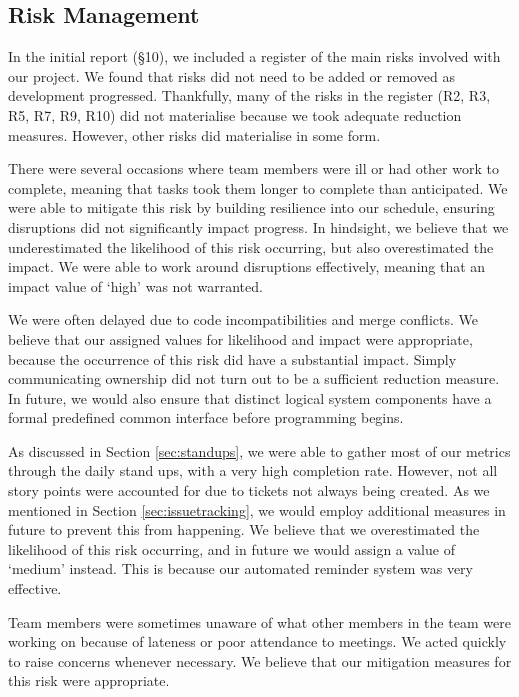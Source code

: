 \subsection{Risk Management}
In the initial report (§10), we included a register of the main risks involved with our project.  We found that risks did not need to be added or removed as development progressed. Thankfully, many of the risks in the register (R2, R3, R5, R7, R9, R10) did not materialise because we took adequate reduction measures. However, other risks did materialise in some form. 
\newpage
\begin{description}[topsep=3pt, itemsep=2pt]
	\item[R1: Unavailability of Team Members] There were several occasions where team members were ill or had other work to complete, meaning that tasks took them longer to complete than anticipated. We were able to mitigate this risk by building resilience into our schedule, ensuring disruptions did not significantly impact progress. In hindsight, we believe that we underestimated the likelihood of this risk occurring, but also overestimated the impact. We were able to work around disruptions effectively, meaning that an impact value of `high’ was not warranted.
	\item[R4: Incompatibilities and Merge Conflcits] We were often delayed due to code incompatibilities and merge conflicts. We believe that our assigned values for likelihood and impact were appropriate, because the occurrence of this risk did have a substantial impact. Simply communicating ownership did not turn out to be a sufficient reduction measure. In future, we would also ensure that distinct logical system components have a formal predefined common interface before programming begins.
	\item[R6: Collection of Metrics] As discussed in Section \ref{sec:standups}, we were able to gather most of our metrics through the daily stand ups, with a very high completion rate. However, not all story points were accounted for due to tickets not always being created. As we mentioned in Section \ref{sec:issuetracking}, we would employ additional measures in future to prevent this from happening. We believe that we overestimated the likelihood of this risk occurring, and in future we would assign a value of `medium’ instead. This is because our automated reminder system was very effective.
	\item[R8: Lateness to Meetings] Team members were sometimes unaware of what other members in the team were working on because of lateness or poor attendance to meetings. We acted quickly to raise concerns whenever necessary. We believe that our mitigation measures for this risk were appropriate. 
\end{description}
